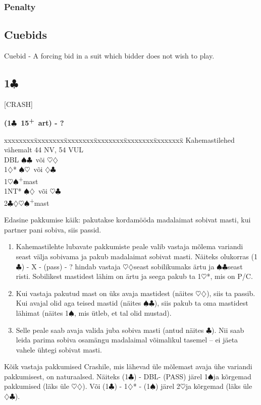 \documentclass[10pt]{article}
\renewcommand{\c}{$\clubsuit$}
\renewcommand{\d}{$\diamondsuit$}
\newcommand{\h}{$\heartsuit$}
\newcommand{\s}{$\spadesuit$}
\newcommand{\p}{\textsuperscript{+}}
\newcommand{\x}{DBL}
\newenvironment{bidtable}[1][]
{\textbf{#1}
  \begin{adjustwidth}{1em}{}
    \addvspace{2pt}
    \begin{tabbing}
      xxxxxxxx\=xxxxxxxx\=xxxxxxxx\=xxxxxxxx\=xxxxxxxx\=xxxxxxxx\=\kill}
{\end{tabbing}\end{adjustwidth}\bigskip}%
\newcommand{\pdfc}{\texorpdfstring{\c{}}{C}}
\begin{document}
\begin{multicols*}{2}
\subsubsection{Penalty}




\subsection{Cuebids}
Cuebid - A forcing bid in a suit which bidder does not wish to play.

\subsection{1\pdfc}

[CRASH]

\begin{bidtable}[(1\c\ 15\p\ art) - ?]
Kahemastilehed vähemalt 44 NV, 54 VUL \\
\x        \> \s\c\ või \h\d\          \\
1\d*      \> \s\h\ või \d\c           \\
1\h\s     {}\p mast                 \\
1NT*      \> \s\d\ või \h\c\          \\
2\c\d\h\s {}\p mast
\end{bidtable}

Edasine pakkumise käik: pakutakse kordamööda madalaimat sobivat masti, kui partner pani sobiva, siis passid.
\begin{enumerate}
\item Kahemastilehte lubavate pakkumiste peale valib vastaja mõlema variandi seast välja sobivama ja pakub madalaimat sobivat masti. Näiteks olukorras (1\c) - X - (pass) - ? hindab vastaja \h\d seast sobilikumaks ärtu ja \s\c seast risti. Sobilikest mastidest lähim on ärtu ja seega pakub ta 1\h*, mis on P/C.
\item  Kui vastaja pakutud mast on üks avaja mastidest (näites \h\d), siis ta passib. Kui avajal olid aga teised mastid (näites \s\c), siis pakub ta oma mastidest lähimat (näites 1\s, mis ütleb, et tal olid mustad).
\item  Selle peale saab avaja valida juba sobiva masti (antud näites \c). Nii saab leida parima sobiva osamängu madalaimal võimalikul tasemel – ei jäeta vahele ühtegi sobivat masti.
\end{enumerate}
Kõik vastaja pakkumised Crashile, mis lähevad üle mõlemast avaja ühe variandi pakkumisest, on naturaalsed. Näiteks (1\c) - \x - (PASS) järel 1\s ja kõrgemad pakkumised (läks üle \h\d). Või (1\c) - 1\d* - (1\s) järel 2\h ja kõrgemad (läks üle \d\c).


\end{multicols*}
\end{document}

